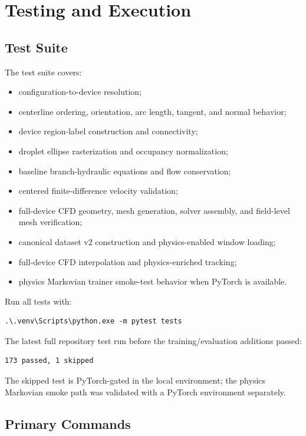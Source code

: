 \section{Testing and Execution}

\subsection{Test Suite}

The test suite covers:

\begin{itemize}
  \item configuration-to-device resolution;
  \item centerline ordering, orientation, arc length, tangent, and normal behavior;
  \item device region-label construction and connectivity;
  \item droplet ellipse rasterization and occupancy normalization;
  \item baseline branch-hydraulic equations and flow conservation;
  \item centered finite-difference velocity validation;
  \item full-device CFD geometry, mesh generation, solver assembly, and
        field-level mesh verification;
  \item canonical dataset v2 construction and physics-enabled window loading;
  \item full-device CFD interpolation and physics-enriched tracking;
  \item physics Markovian trainer smoke-test behavior when PyTorch is available.
\end{itemize}

Run all tests with:

\begin{verbatim}
.\.venv\Scripts\python.exe -m pytest tests
\end{verbatim}

The latest full repository test run before the training/evaluation additions
passed:

\begin{verbatim}
173 passed, 1 skipped
\end{verbatim}

The skipped test is PyTorch-gated in the local environment; the physics
Markovian smoke path was validated with a PyTorch environment separately.

\subsection{Primary Commands}

